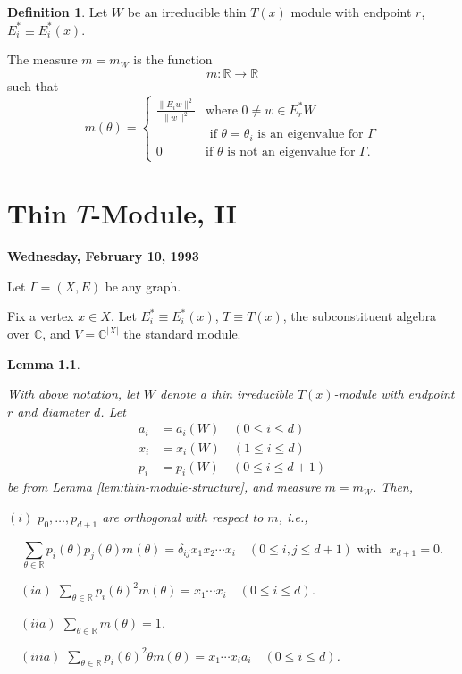 \documentclass[
]{book}
\newtheorem{lemma}{Lemma}[chapter]
\theoremstyle{definition}
\newtheorem{definition}{Definition}[chapter]
\theoremstyle{definition}
\theoremstyle{definition}
\theoremstyle{definition}
\theoremstyle{remark}
\begin{document}
\begin{definition}
\protect\hypertarget{def:measure}{}\label{def:measure}Let \(W\) be an irreducible thin \(T(x)\) module with endpoint \(r\), \(E^*_i \equiv E_i^*(x)\).

The measure  \(m = m_W\) is the function
\[m: \mathbb{R} \to \mathbb{R}\]
such that
\[
m(\theta) = \begin{cases}\frac{\|E_iw\|^2}{\|w\|^2} & \text{where } 0\neq w \in E^*_rW\\
& \text{ if $\theta = \theta_i$ is an eigenvalue for $\Gamma$}\\
0 & \text{if $\theta$ is not an eigenvalue for $\Gamma$.}
\end{cases}\]
\end{definition}

\hypertarget{lec10}{%
\chapter{\texorpdfstring{Thin \(T\)-Module, II}{Thin T-Module, II}}\label{lec10}}

\textbf{Wednesday, February 10, 1993}

Let \(\Gamma = (X, E)\) be any graph.

Fix a vertex \(x\in X\). Let \(E^*_i \equiv E^*_i(x)\), \(T\equiv T(x)\), the subconstituent algebra over \(\mathbb{C}\), and \(V = \mathbb{C}^{|X|}\) the standard module.

\begin{lemma}
\protect\hypertarget{lem:orthogonality}{}\label{lem:orthogonality}

With above notation, let \(W\) denote a thin irreducible \(T(x)\)-module with endpoint \(r\) and diameter \(d\). Let
\begin{align}
a_i & = a_i(W) \quad (0\leq i \leq d)\\
x_i & = x_i(W) \quad (1\leq i \leq d)\\
p_i & = p_i(W) \quad (0\leq i \leq d+1)
\end{align}
be from Lemma \ref{lem:thin-module-structure}, and measure \(m = m_W\).
Then,

\((i)\) \(p_0, \ldots, p_{d+1}\) are orthogonal with respect to \(m\), i.e.,

\[\sum_{\theta\in \mathbb{R}}p_i(\theta)p_j(\theta)m(\theta) = \delta_{ij}x_1x_2\cdots x_i \quad (0\leq i,j\leq d+1) \text{ with }\; x_{d+1}=0.\]

\(\quad (ia)\) \({\displaystyle \sum_{\theta\in \mathbb{R}}p_i(\theta)^2m(\theta) = x_1\cdots x_i \quad (0\leq i\leq d)}\).

\(\quad (iia)\) \({\displaystyle \sum_{\theta\in \mathbb{R}}m(\theta) = 1}\).

\(\quad (iiia)\) \({\displaystyle \sum_{\theta\in \mathbb{R}}p_i(\theta)^2\theta m(\theta) = x_1\cdots x_ia_i \quad (0\leq i\leq d)}\).

\end{lemma}
\end{document}

